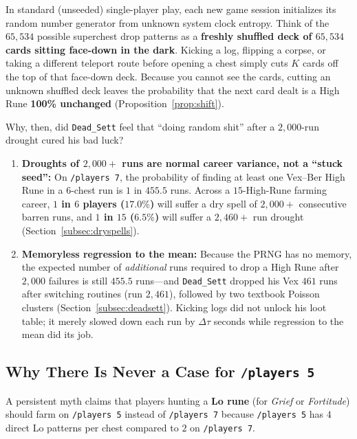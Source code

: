\documentclass[11pt,reqno]{amsart}
\theoremstyle{definition}
\begin{document}
In standard (unseeded) single-player play, each new game session initializes its random number generator from unknown system clock entropy. Think of the $65{,}534$ possible superchest drop patterns as a \textbf{freshly shuffled deck of $65{,}534$ cards sitting face-down in the dark}. Kicking a log, flipping a corpse, or taking a different teleport route before opening a chest simply cuts $K$ cards off the top of that face-down deck. Because you cannot see the cards, cutting an unknown shuffled deck leaves the probability that the next card dealt is a High Rune \textbf{100\% unchanged} (Proposition~\ref{prop:shift}).

Why, then, did \texttt{Dead\_Sett} feel that ``doing random shit'' after a $2{,}000$-run drought cured his bad luck?
\begin{enumerate}
    \item \textbf{Droughts of $2{,}000+$ runs are normal career variance, not a ``stuck seed'':} On \texttt{/players~7}, the probability of finding at least one Vex--Ber High Rune in a $6$-chest run is $1$ in $455.5$ runs. Across a $15$-High-Rune farming career, \textbf{$1$ in $6$ players ($17.0\%$)} will suffer a dry spell of $2{,}000+$ consecutive barren runs, and \textbf{$1$ in $15$ ($6.5\%$)} will suffer a $2{,}460+$ run drought (Section~\ref{subsec:dryspells}).
    \item \textbf{Memoryless regression to the mean:} Because the PRNG has no memory, the expected number of \emph{additional} runs required to drop a High Rune after $2{,}000$ failures is still $455.5$ runs—and \texttt{Dead\_Sett} dropped his Vex $461$ runs after switching routines (run $2{,}461$), followed by two textbook Poisson clusters (Section~\ref{subsec:deadsett}). Kicking logs did not unlock his loot table; it merely slowed down each run by $\Delta\tau$ seconds while regression to the mean did its job.
\end{enumerate}

\subsection{Why There Is Never a Case for \texttt{/players~5}}

A persistent myth claims that players hunting a \textbf{Lo rune} (for \emph{Grief} or \emph{Fortitude}) should farm on \texttt{/players~5} instead of \texttt{/players~7} because \texttt{/players~5} has $4$ direct Lo patterns per chest compared to $2$ on \texttt{/players~7}.
\end{document}

